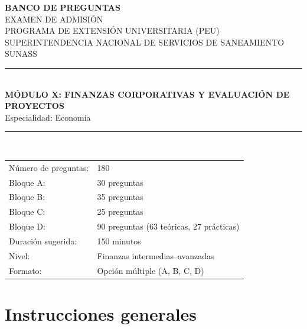\documentclass[11pt,a4paper]{article}
\begin{document}
\begin{titlepage}
\thispagestyle{empty}
\centering
\backboneportadaheader

{\Large\bfseries BANCO DE PREGUNTAS}\\[0.35cm]
{\large EXAMEN DE ADMISIÓN}\\[0.15cm]
{\large PROGRAMA DE EXTENSIÓN UNIVERSITARIA (PEU)}\\[0.15cm]
{\large SUPERINTENDENCIA NACIONAL DE SERVICIOS DE SANEAMIENTO}\\[0.05cm]
{\large SUNASS}\\[1.0cm]

\rule{\linewidth}{0.9pt}\\[0.55cm]
{\LARGE\bfseries MÓDULO X: FINANZAS CORPORATIVAS Y EVALUACIÓN DE PROYECTOS}\\[0.35cm]
{\large Especialidad: Economía}\\[0.55cm]
\rule{\linewidth}{0.9pt}\\[1.0cm]

\begin{tabular}{ll}
\toprule
Número de preguntas: & 180 \\
Bloque A: & 30 preguntas \\
Bloque B: & 35 preguntas \\
Bloque C: & 25 preguntas \\
Bloque D: & 90 preguntas (63 teóricas, 27 prácticas) \\
Duración sugerida: & 150 minutos \\
Nivel: & Finanzas intermedias--avanzadas \\
Formato: & Opción múltiple (A, B, C, D) \\
\bottomrule
\end{tabular}

\vfill
\backboneportadafooter
\end{titlepage}

\section*{Instrucciones generales}
\end{document}
